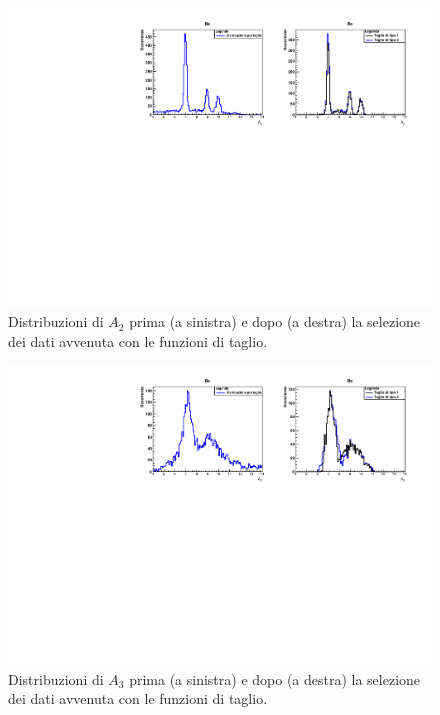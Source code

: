 \documentclass[12pt,a4paper,twoside]{report}
\begin{document}
	\begin{figure}[H]
		\centering
		\includegraphics[width=1.03\linewidth,center]{c_Berillum2.pdf}
		\caption{Distribuzioni di $A_2$ prima (a sinistra) e dopo (a destra) la selezione dei dati avvenuta con le funzioni di taglio.}
		\label{fig:berillium2}
	\end{figure}
	\begin{figure}[H]
		\centering
		\includegraphics[width=1.03\linewidth,center]{c_Berillum3.pdf}
		\caption{Distribuzioni di $A_3$ prima (a sinistra) e dopo (a destra) la selezione dei dati avvenuta con le funzioni di taglio.}
		\label{fig:berillium3}
	\end{figure}
\end{document}
